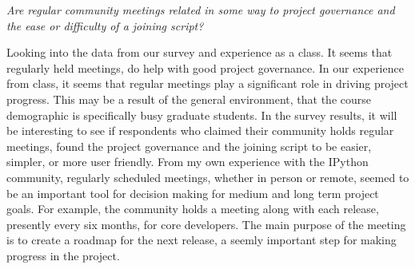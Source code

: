 {\it Are regular community meetings related in some way to project governance and the ease or difficulty of a joining script?}

Looking into the data from our survey and experience as a class. It seems that regularly held meetings, do help with good project governance. In our experience from class, it seems that regular meetings play a significant role in driving project progress. This may be a result of the general environment, that the course demographic is specifically busy graduate students. In the survey results, it will be interesting to see if respondents who claimed their community holds regular meetings, found the project governance and the joining script to be easier, simpler, or more user friendly. From my own experience with the IPython community, regularly scheduled meetings, whether in person or remote, seemed to be an important tool for decision making for medium and long term project goals. For example, the community holds a meeting along with each release, presently every six months, for core developers. The main purpose of the meeting is to create a roadmap for the next release, a seemly important step for making progress in the project.
